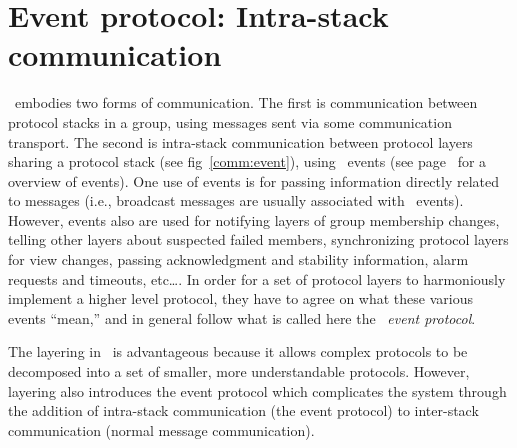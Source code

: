 %
%
%
\newcommand {\eventtype}[2]    {\item {#1:} #2}

\newenvironment{EventType}{%
\begin{itemize}
}{\end{itemize}
}

\newcommand {\chainentry}[2]    {#1 & #2 \\ \hline}

\newenvironment{ChainTable}{%
\begin{quote}\begin{tabular}{|l|l|} \hline
}{\end{tabular}\end{quote}
}

\section{Event protocol: Intra-stack communication}
\label{event:protocol}
\ensemble\ embodies two forms of communication.  The first is
communication between protocol stacks in a group, using messages sent
via some communication transport.  The second is intra-stack
communication between protocol layers sharing a protocol stack (see
fig~\ref{comm:event}), using \ensemble\ events (see
page~\pageref{event:module} for a overview of \ensemble events).  One
use of events is for passing information directly related to messages
(i.e., broadcast messages are usually associated with \ECast\ events).
However, events also are used for notifying layers of group membership
changes, telling other layers about suspected failed members,
synchronizing protocol layers for view changes, passing acknowledgment
and stability information, alarm requests and timeouts, etc\ldots.  In
order for a set of protocol layers to harmoniously implement a higher
level protocol, they have to agree on what these various events
``mean,'' and in general follow what is called here the \ensemble\
\emph{event protocol}.

The layering in \ensemble\ is advantageous because it allows complex protocols
to be decomposed into a set of smaller, more understandable protocols.
However, layering also introduces the event protocol which complicates the
system through the addition of intra-stack communication (the event
protocol) to inter-stack communication (normal message communication).

